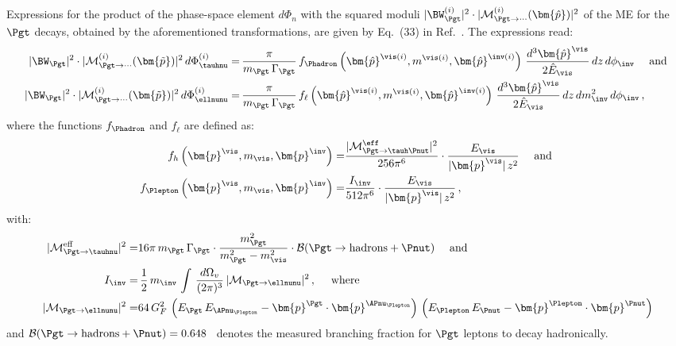 Expressions for the product of the phase-space element $d\Phi_{n}$ 
with the squared moduli $\vert \BW^{(i)}_{\Pgt} \vert^{2} \cdot \vert \mathcal{M}^{(i)}_{\Pgt\to\cdots}(\bm{\hat{p}}) \vert^{2}$ 
of the ME for the $\Pgt$ decays, 
obtained by the aforementioned transformations, are given by Eq.~(33) in Ref.~\cite{SVfitMEM}.
The expressions read:
\begin{align}
\vert \BW_{\Pgt} \vert^{2} \cdot \vert \mathcal{M}^{(i)}_{\Pgt\to\cdots}(\bm{\tilde{p}}) \vert^{2} \, d\Phi^{(i)}_{\tauhnu} 
 = & \, \frac{\pi}{m_{\Pgt} \, \Gamma_{\Pgt}} \,
 f_{\Phadron}\left(\bm{\hat{p}}^{\vis(i)}, m^{\vis(i)},
   \bm{\hat{p}}^{\inv(i)}\right) \, \frac{d^{3}\bm{\hat{p}}^{\vis}}{2 \hat{E}_{\vis}} \, dz \, d\phi_{\inv} \quad \mbox{ and } \nonumber \\
\vert \BW_{\Pgt} \vert^{2} \cdot \vert \mathcal{M}^{(i)}_{\Pgt\to\cdots}(\bm{\tilde{p}}) \vert^{2} \, d\Phi^{(i)}_{\ellnunu} 
 = & \, \frac{\pi}{m_{\Pgt} \, \Gamma_{\Pgt}} \, f_{\ell}\left(\bm{\hat{p}}^{\vis(i)},
 m^{\vis(i)}, \bm{\hat{p}}^{\inv(i)}\right) \, \frac{d^{3}\bm{\hat{p}}^{\vis}}{2 \hat{E}_{\vis}} \, dz \, dm^{2}_{\inv} \, d\phi_{\inv}
 \nonumber \, ,
\end{align}
where the functions $f_{\Phadron}$ and $f_{\ell}$ are defined as:
\begin{align}
f_{h}\left(\bm{p}^{\vis}, m_{\vis}, \bm{p}^{\inv}\right) = &
  \frac{\vert\mathcal{M}^{\eff}_{\Pgt \to \tauh\Pnut}\vert^{2}}{256\pi^{6}} \cdot \frac{E_{\vis}}{\vert\bm{p}^{\vis}\vert \, z^{2}} \quad \mbox{ and } \nonumber \\
f_{\Plepton}\left(\bm{p}^{\vis}, m_{\vis}, \bm{p}^{\inv}\right) = &
  \frac{I_{\inv}}{512\pi^{6}} \cdot \frac{E_{\vis}}{\vert\bm{p}^{\vis}\vert \, z^{2}} \nonumber \, , 
\end{align}
with:
\begin{align}
\vert \mathcal{M}^{\textrm{eff}}_{\Pgt \to \tauhnu} \vert^{2} = & 16 \pi \, m_{\Pgt} \, \Gamma_{\Pgt} \cdot
  \frac{m_{\Pgt}^{2}}{m_{\Pgt}^{2} - m_{\vis}^{2}} \cdot \mathcal{B}(\Pgt \to \textrm{hadrons} + \Pnut) \quad \mbox { and } \nonumber \\
I_{\inv} = & \, \frac{1}{2} \, m_{\inv} \, \int \, \frac{d\Omega_{v}}{(2\pi)^{3}} \, 
  \vert\mathcal{M}_{\Pgt \to \ellnunu}\vert^{2} \, , \quad \mbox { where } \nonumber \\ 
\vert\mathcal{M}_{\Pgt \to \ellnunu} \vert^{2} = & 64 \, G^{2}_{F} \,
  \left( E_{\Pgt} \, E_{\APnu_{\Plepton}} - \bm{p}^{\Pgt} \cdot
  \bm{p}^{\APnu_{\Plepton}} \right) \, \left( E_{\Plepton} \,
  E_{\Pnut} - \bm{p}^{\Plepton} \cdot \bm{p}^{\Pnut} \right) \nonumber 
\end{align}
and $\mathcal{B}(\Pgt \to \textrm{hadrons} + \Pnut) = 0.648$~\cite{PDG} 
denotes the measured branching fraction for $\Pgt$ leptons to decay hadronically.


